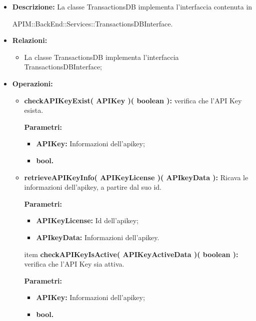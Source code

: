 \begin{itemize}
	\item \textbf{Descrizione:} La classe TransactionsDB implementa l'interfaccia contenuta in 
		\begin{minipage}{\linewidth}
			APIM::BackEnd::Services::TransactionsDBInterface.
	\end{minipage}

	
	
	\item \textbf{Relazioni:}
		\begin{itemize}
			\item La classe TransactionsDB implementa l'interfaccia TransactionsDBInterface;
		\end{itemize}
	\item \textbf{Operazioni:}
		\begin{itemize}
			
			\item \textbf{checkAPIKeyExist( APIKey )( boolean ):} verifica che l'API Key esista.
				\begin{description}
					\item[\textbf{Parametri:}]
				\end{description}
				\begin{itemize}
					\item \textbf{APIKey:} Informazioni dell'apikey;
					\item \textbf{bool.}
				\end{itemize}
		
			\item \textbf{retrieveAPIKeyInfo( APIKeyLicense )( APIkeyData ):} Ricava le informazioni dell'apikey, a partire dal suo id.
				\begin{description}
    				\item[\textbf{Parametri:}]
				\end{description}
				\begin{itemize}
					\item \textbf{APIKeyLicense:} Id dell'apikey;
					\item \textbf{APIkeyData:} Informazioni dell'apikey.
				\end{itemize}
			
			item \textbf{checkAPIKeyIsActive( APIKeyActiveData )( boolean ):} verifica che l'API Key sia attiva.
				\begin{description}
					\item[\textbf{Parametri:}]
				\end{description}
				\begin{itemize}
					\item \textbf{APIKey:} Informazioni dell'apikey;
					\item \textbf{bool.}
				\end{itemize}
			

\end{itemize}
\end{itemize}
